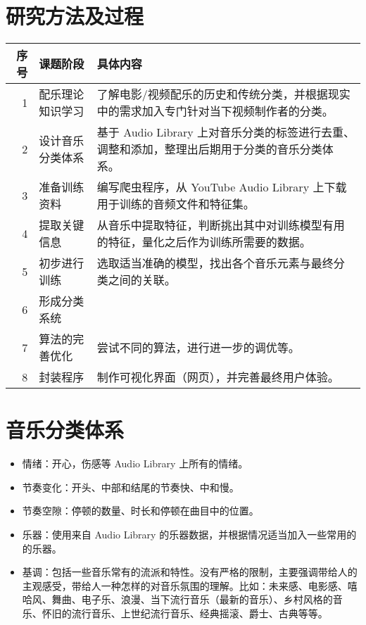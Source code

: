 \documentclass[a4paper,utf8,10pt]{article}
\newcommand{\sept}{\setlength\itemsep{-4pt}}
\begin{document}
\section{研究方法及过程}
\noindent\begin{tabular}{ r | l | p{13.5cm} }
\hline
序号 & 课题阶段         & 具体内容                                                                                     \\ \hline
   1 & 配乐理论知识学习 & 了解电影/视频配乐的历史和传统分类，并根据现实中的需求加入专门针对当下视频制作者的分类。      \\ \hline
   2 & 设计音乐分类体系 & 基于 Audio Library 上对音乐分类的标签进行去重、调整和添加，整理出后期用于分类的音乐分类体系。\\ \hline
   3 & 准备训练资料     & 编写爬虫程序，从 YouTube Audio Library 上下载用于训练的音频文件和特征集。                    \\ \hline
   4 & 提取关键信息     & 从音乐中提取特征，判断挑出其中对训练模型有用的特征，量化之后作为训练所需要的数据。           \\ \hline
   5 & 初步进行训练     & 选取适当准确的模型，找出各个音乐元素与最终分类之间的关联。                                   \\ \hline
   6 & 形成分类系统     &                                                                                              \\ \hline
   7 & 算法的完善优化   & 尝试不同的算法，进行进一步的调优等。                                                         \\ \hline
   8 & 封装程序         & 制作可视化界面（网页），并完善最终用户体验。                                                 \\ \hline
\end{tabular}

\section{音乐分类体系}

\noindent\begin{itemize}
  \sept
  \item 情绪：开心，伤感等 Audio Library 上所有的情绪。
  \item 节奏变化：开头、中部和结尾的节奏快、中和慢。
  \item 节奏空隙：停顿的数量、时长和停顿在曲目中的位置。
  \item 乐器：使用来自 Audio Library 的乐器数据，并根据情况适当加入一些常用的的乐器。
  \item 基调：包括一些音乐常有的流派和特性。没有严格的限制，主要强调带给人的主观感受，带给人一种怎样的对音乐氛围的理解。比如：未来感、电影感、嘻哈风、舞曲、电子乐、浪漫、当下流行音乐（最新的音乐）、乡村风格的音乐、怀旧的流行音乐、上世纪流行音乐、经典摇滚、爵士、古典等等。
\end{itemize}
\end{document}
